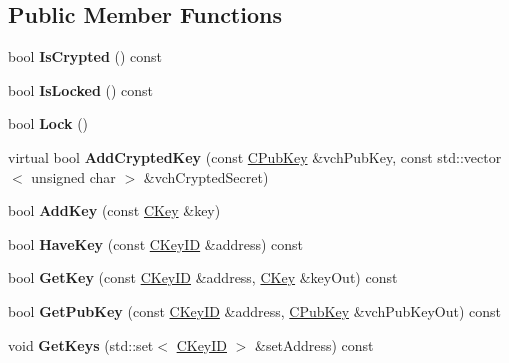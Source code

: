 \subsection*{Public Member Functions}
\begin{DoxyCompactItemize}
\item 
\mbox{\label{class_c_crypto_key_store_acc8fed44366c98fb481333ca6e867088}} 
bool {\bfseries Is\+Crypted} () const
\item 
\mbox{\label{class_c_crypto_key_store_a52919fa284a3aa10f1b4bd6018b6dbee}} 
bool {\bfseries Is\+Locked} () const
\item 
\mbox{\label{class_c_crypto_key_store_ab73ebcbfa6e0aaf271d0fff9369a6685}} 
bool {\bfseries Lock} ()
\item 
\mbox{\label{class_c_crypto_key_store_a9f4d2df95008205b2b9784c5f0e8e12b}} 
virtual bool {\bfseries Add\+Crypted\+Key} (const \mbox{\hyperlink{class_c_pub_key}{C\+Pub\+Key}} \&vch\+Pub\+Key, const std\+::vector$<$ unsigned char $>$ \&vch\+Crypted\+Secret)
\item 
\mbox{\label{class_c_crypto_key_store_a8a2d1854b2c14fbdb716cd22be9d790d}} 
bool {\bfseries Add\+Key} (const \mbox{\hyperlink{class_c_key}{C\+Key}} \&key)
\item 
\mbox{\label{class_c_crypto_key_store_a6c115cf1fc4129b43c8846b3d51d8ff5}} 
bool {\bfseries Have\+Key} (const \mbox{\hyperlink{class_c_key_i_d}{C\+Key\+ID}} \&address) const
\item 
\mbox{\label{class_c_crypto_key_store_af46ec271fffb65a113702ba40a3738c8}} 
bool {\bfseries Get\+Key} (const \mbox{\hyperlink{class_c_key_i_d}{C\+Key\+ID}} \&address, \mbox{\hyperlink{class_c_key}{C\+Key}} \&key\+Out) const
\item 
\mbox{\label{class_c_crypto_key_store_a20b474adfe6900bb36cd4fd6f9c31380}} 
bool {\bfseries Get\+Pub\+Key} (const \mbox{\hyperlink{class_c_key_i_d}{C\+Key\+ID}} \&address, \mbox{\hyperlink{class_c_pub_key}{C\+Pub\+Key}} \&vch\+Pub\+Key\+Out) const
\item 
\mbox{\label{class_c_crypto_key_store_a84e2fb905745176ab784c3413520e46f}} 
void {\bfseries Get\+Keys} (std\+::set$<$ \mbox{\hyperlink{class_c_key_i_d}{C\+Key\+ID}} $>$ \&set\+Address) const
\end{DoxyCompactItemize}
